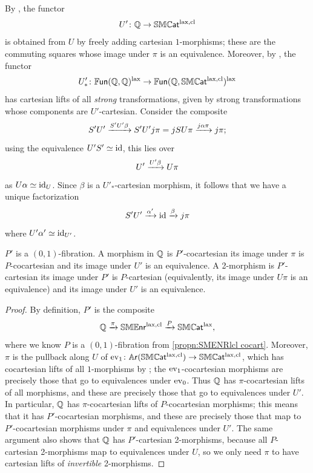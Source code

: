 \documentclass[a4paper,11pt]{article}
\begin{document}
\begin{construction}
  By \cite[Theorem 4.2.1]{decorated}, the functor \[U' \colon \tQ \to
  \SMCATlcl\] is obtained from $U$ by freely adding cartesian
  $1$-morphisms; these are the commuting squares whose image under $\pi$
  is an equivalence. Moreover, by \cite[Corollary 3.5.1]{decorated}, 
  the functor \[U'_{*} \colon \FUN(\tQ, \tQ)^{\lax} \to
    \FUN(\tQ, \SMCATlcl)^{\lax}\]
  has cartesian lifts of all \emph{strong} transformations, given by
  strong transformations whose components are $U'$-cartesian. Consider
  the composite 
  \[ S'U' \xto{S'U'\beta} S'U'j\pi = jSU\pi \xto{j \alpha \pi} j\pi; \]
  using the equivalence $U'S' \simeq \text{\textup{id}}$, this lies over
  \[ U' \xto{U'\beta} U\pi\]
  as $U \alpha \simeq \text{\textup{id}}_{U}$. Since $\beta$ is a $U'_{*}$-cartesian
  morphism, it follows that we have a unique factorization
  \[ S'U' \xto{\alpha'} \id \xto{\beta} j\pi\]
  where $U'\alpha' \simeq \text{\textup{id}}_{U'}$. 
\end{construction}

\begin{propn}\label{propn:P' fib}
 $P'$ is a $(0,1)$-fibration. A morphism in $\mathbb{Q}$ is
  $P'$-cocartesian \IFF{} its image under $\pi$ is $P$-cocartesian and
  its image under $U'$ is an equivalence. A 2-morphism is
  $P'$-cartesian \IFF{} its image under $P'$ is $P$-cartesian
  (equivalently, its image under $U\pi$ is an equivalence) and its
  image under $U'$ is an equivalence.
\end{propn}
\begin{proof}
  By definition, $P'$ is the composite
  \[ \tQ \xto{\pi} \SMENRlcl \xto{P} \SMCATl, \] where we know $P$ is
  a $(0,1)$-fibration from \cref{propn:SMENRlcl cocart}. Moreover,
  $\pi$ is the pullback along $U$ of
  $\ev_{1} \colon \AR(\SMCATlcl) \to \SMCATlcl$, which has cocartesian
  lifts of all $1$-morphisms by \cite[Theorem 4.1.2]{decorated}; the
  $\text{\textup{ev}}_{1}$-cocartesian morphisms are precisely those that go to
  equivalences under $\text{\textup{ev}}_{0}$. Thus $\mathbb{Q}$ has $\pi$-cocartesian lifts
  of all morphisms, and these are precisely those that go to
  equivalences under $U'$. In particular, $\mathbb{Q}$ has $\pi$-cocartesian
  lifts of $P$-cocartesian morphisms; this means that it has
  $P'$-cocartesian morphisms, and these are precisely those that map
  to $P'$-cocartesian morphisms under $\pi$ and equivalences under
  $U'$.  The same argument also shows that $\mathbb{Q}$ has $P'$-cartesian
  2-morphisms, because all $P$-cartesian 2-morphisms map to
  equivalences under $U$, so we only need $\pi$ to have cartesian
  lifts of \emph{invertible} 2-morphisms.
\end{proof}
\end{document}

